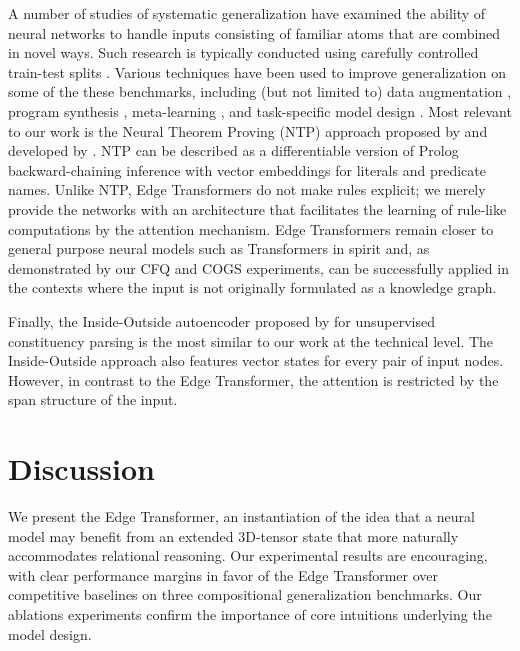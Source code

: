 \documentclass{article}
\begin{document}
A number of studies of systematic generalization have examined the
ability of neural networks to handle inputs consisting of familiar
atoms that are combined in novel ways. Such research is
typically conducted using carefully controlled train-test splits
\citep{lake_generalization_2018,hupkes_compositionality_2019,sinha_clutrr_2019,bahdanau_systematic_2019,keysers_measuring_2020,kim_cogs_2020}.
Various techniques have been used to improve generalization on some of
the these benchmarks, including (but not limited to) data augmentation
\citep{andreas_good-enough_2019,akyurek_learning_2020}, program
synthesis \citep{nye_learning_2020}, meta-learning
\citep{lake_compositional_2019}, and task-specific model design
\citep{guo_hierarchical_2020}. Most relevant to our work is the Neural
Theorem Proving (NTP) approach proposed by
\citep{rocktaschel_end--end_2017} and developed by
\citep{minervini_learning_2020}. NTP can be described as a
differentiable version of Prolog backward-chaining inference with
vector embeddings for literals and predicate names. Unlike NTP, Edge
Transformers do not make rules explicit; we merely provide the
networks with an architecture that facilitates the learning of
rule-like computations by the attention mechanism. Edge Transformers
remain closer to general purpose neural models such as Transformers in
spirit and, as demonstrated by our CFQ and COGS experiments, can be
successfully applied in the contexts where the input is not originally
formulated as a knowledge graph.

Finally, the Inside-Outside autoencoder proposed by
\citet{drozdov_unsupervised_2019} for unsupervised constituency
parsing is the most similar to our work at the technical level. The
Inside-Outside approach also features vector states for every pair of
input nodes. However, in contrast to the Edge Transformer, the
attention is restricted by the span structure of the input.

\section{Discussion}
\label{sec:discussion}
We present the Edge Transformer, an instantiation of the idea that a
neural model may benefit from an extended 3D-tensor state that more
naturally accommodates relational reasoning. Our experimental results
are encouraging, with clear performance margins in favor of the Edge
Transformer over competitive baselines on three compositional
generalization benchmarks. Our ablations experiments confirm the importance of core
intuitions underlying the model design.
\end{document}
